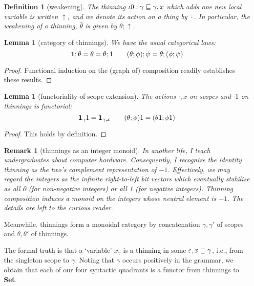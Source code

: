 \documentclass{jfp1}
\newtheorem{lemma}[theorem]{Lemma}
\newtheorem{definition}[theorem]{Definition}
\newtheorem{remark}[theorem]{Remark}
\newcommand{\emp}{\varepsilon}
\begin{document}
\newcommand{\wk}{\uparrow}
\newcommand{\wka}{\hat}
\begin{definition}[weakening]
  The thinning $\iota0 : \gamma\sqsubseteq\gamma,x$ which adds one new local variable is written
  $\wk$, and we denote its action on a thing by $\wka\cdot$. In particular, the weakening
  of a thinning, $\wka\theta$ is given by $\theta;\wk$.
\end{definition}

\begin{lemma}[category of thinnings]
  We have the usual categorical laws:
  \[
    \mathbf{1};\theta = \theta = \theta;\mathbf{1} \qquad
    (\theta;\phi);\psi = \theta;(\phi;\psi)
    \]
\end{lemma}
\begin{proof}
  Functional induction on the (graph of) composition readily establishes these results.
\end{proof}

\begin{lemma}[functoriality of scope extension]
  The actions $\cdot,x$ on scopes and $\cdot1$ on thinnings is functorial:
  \[
    \mathbf{1}_\gamma1 = \mathbf{1}_{\gamma,x}\qquad (\theta;\phi)1 = (\theta1;\phi1)
    \]
\end{lemma}
\begin{proof}
  This holds by definition.
\end{proof}

\begin{remark}[thinnings as an integer monoid]
  In another life, I teach undergraduates about computer hardware. Consequently, I recognize the identity thinning as the two's complement representation of $-1$.
  Effectively, we may regard the integers as the infinite right-to-left bit vectors which eventually stabilise as all 0 (for non-negative integers) or all 1 (for negative integers). Thinning composition induces a monoid on the integers whose neutral element is $-1$. The details are left to the curious reader.
\end{remark}

Meanwhile, thinnings form a monoidal category by concatenation $\gamma,\gamma'$ of scopes and $\theta,\theta'$ of thinnings.

The formal truth is that a `variable' $x_\gamma$ is a thinning
in some $\emp,x \thin \gamma$, i.e., from the singleton scope to $\gamma$. Noting that $\gamma$ occurs
positively in the grammar, we obtain that each of our four syntactic
quadrants is a functor from thinnings to \textbf{Set}.
\end{document}
